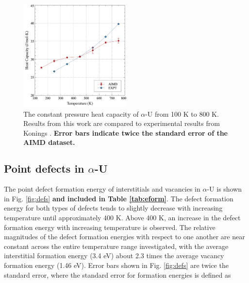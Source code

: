 \documentclass[utf8]{frontiersSCNS} %
\providecommand{\DIFaddtex}[1]{{\bf #1}} %
\providecommand{\DIFaddbegin}{\protect\color{blue}} %
\providecommand{\DIFaddend}{\protect\color{black}} %
\providecommand{\DIFaddFL}[1]{\DIFadd{#1}} %
\providecommand{\DIFaddbeginFL}{} %
\providecommand{\DIFaddendFL}{} %
\providecommand{\DIFdelbeginFL}{} %
\providecommand{\DIFdelendFL}{} %
\providecommand{\DIFadd}[1]{\texorpdfstring{\DIFaddtex{#1}}{#1}} %
\begin{document}
 \begin{figure}[hbt]
	\centering
	\DIFdelbeginFL %
\DIFdelendFL \DIFaddbeginFL \includegraphics[width=0.5\textwidth]{cp.jpg}
    \DIFaddendFL \caption{The constant pressure heat capacity of $\alpha$-U from 100 K to 800 K. Results from this work are compared to experimental results from Konings \cite{konings2010}. \DIFaddbeginFL \DIFaddFL{Error bars indicate twice the standard error of the AIMD dataset.}\DIFaddendFL }\label{fig:cp}
\end{figure}

\FloatBarrier

\subsection{Point defects in $\alpha$-U}

The point defect formation energy of interstitials and vacancies in $\alpha$-U is shown in Fig. \ref{fig:defs} \DIFaddbegin \DIFadd{and included in Table \ref{tab:eform}}\DIFaddend . The defect formation energy for both types of defects tends to slightly decrease with increasing temperature until approximately 400 K. Above 400 K, an increase in the defect formation energy with increasing temperature is observed. The relative magnitudes of the defect formation energies with respect to one another are near constant across the entire temperature range investigated, with the average interstitial formation energy (3.4 eV) about 2.3 times the average vacancy formation energy (1.46 eV). Error bars shown in Fig. \ref{fig:defs} are twice the standard error, where the standard error for formation energies is defined as 
\end{document}
